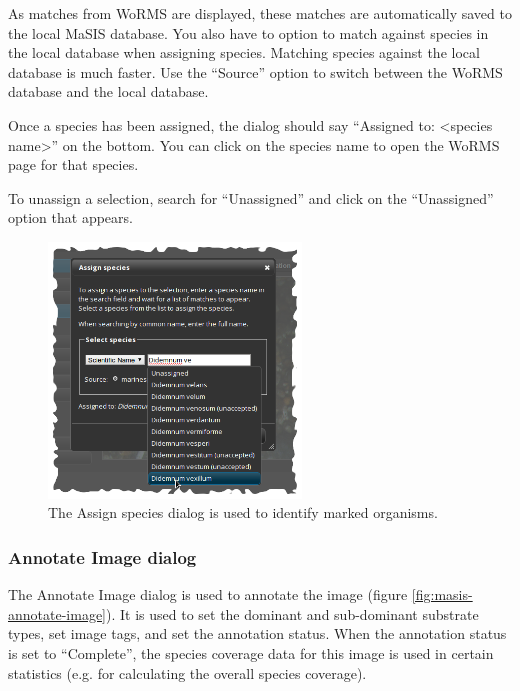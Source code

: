 \documentclass[twoside,a4paper]{refart}
\begin{document}
As matches from WoRMS are displayed, these matches are automatically saved to the local MaSIS database. You also have to option to match against species in the local database when assigning species. Matching species against the local database is much faster. Use the ``Source'' option to switch between the WoRMS database and the local database.

Once a species has been assigned, the dialog should say ``Assigned to: <species name>'' on the bottom. You can click on the species name to open the WoRMS page for that species.

To unassign a selection, search for ``Unassigned'' and click on the ``Unassigned'' option that appears.

\begin{figure}[hbtp]
\centering
\includegraphics[width=0.6\textwidth]{screenshots/masis-species}
\caption{The Assign species dialog is used to identify marked organisms.}
\label{fig:masis-species}
\end{figure}

\subsubsection{Annotate Image dialog}
\label{Annotate Image dialog}

The Annotate Image dialog is used to annotate the image (figure \ref{fig:masis-annotate-image}). It is used to set the dominant and sub-dominant substrate types, set image tags, and set the annotation status. When the annotation status is set to ``Complete'', the species coverage data for this image is used in certain statistics (e.g. for calculating the overall species coverage).
\end{document}

